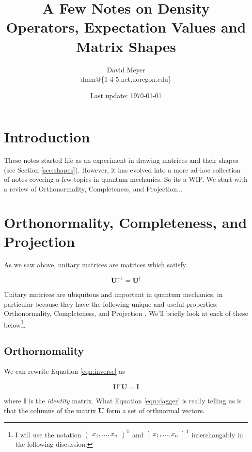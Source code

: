 \documentclass[11pt, oneside]{article}   	%
\title{A Few Notes on Density Operators, Expectation Values and Matrix Shapes}
\author{David Meyer \\ dmm@\{1-4-5.net,uoregon.edu\}}
\date{Last update: \today}							%
\begin{document}
\maketitle

\section{Introduction}
These notes started life as an experiment in drawing matrices and their shapes (see Section \ref{sec:shapes}). However, it has evolved into a more ad-hoc collection of notes
covering a few topics in quantum mechanics. So its a WIP. We start with a review of Orthonormality, Completeness, and Projection...


\section{Orthonormality, Completeness, and Projection}
As we saw above, unitary matrices are matrices which satisfy 

\begin{equation}
\mathbf{U}^{-1} = \mathbf{U}^{\dagger}
\label{eqn:inverse}
\end{equation}

\bigskip
\noindent
Unitary matrices are ubiquitous and important in quantum mechanics, in 
particular because they have the following unique and useful properties: Orthonormality, Completeness, and Projection \cite{cresser2007}. 
We'll briefly look at each of these below\footnote{I will use the 
notation $\begin{pmatrix} x_1, \hdots, x_n \end{pmatrix}^{\text{T}}$ and $\begin{bmatrix} x_1, \hdots, x_n \end{bmatrix}^\text{T}$ interchangably in the following discussion.}.


\subsection{Orthornomality}
We can rewrite Equation \ref{eqn:inverse} as

\begin{equation}
\mathbf{U}^{\dagger} \mathbf{U} = \mathbf{I}
\label{eqn:dagger}
\end{equation}

\bigskip
\noindent
where \textbf{I} is the \emph{identity} matrix. What Equation \ref{eqn:dagger} is really telling us is that the columns of the matrix \textbf{U} form a set of orthnormal vectors.
\end{document}
